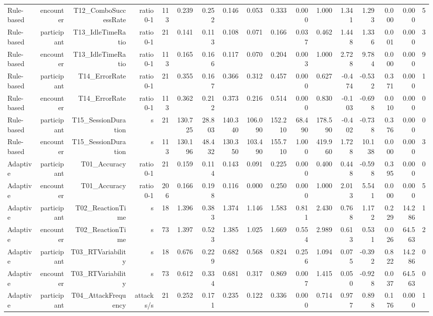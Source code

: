 \documentclass[10pt]{article}
\begin{document}
{\begin{longtable}{lrrrrrrrrrrrrrrrr}
Rule-based & encounter & T12\_ComboSuccessRate & ratio 0-1 & 113 & 0.239 & 0.252 & 0.146 & 0.053 & 0.333 & 0.000 & 1.000 & 1.341 & 1.293 & 0.000 & 0.000 & 5 \\
Rule-based & participant & T13\_IdleTimeRatio & ratio 0-1 & 21 & 0.141 & 0.113 & 0.108 & 0.071 & 0.166 & 0.037 & 0.462 & 1.448 & 1.336 & 0.001 & 0.000 & 3 \\
Rule-based & encounter & T13\_IdleTimeRatio & ratio 0-1 & 113 & 0.165 & 0.166 & 0.117 & 0.070 & 0.204 & 0.003 & 1.000 & 2.728 & 9.784 & 0.000 & 0.000 & 9 \\
Rule-based & participant & T14\_ErrorRate & ratio 0-1 & 21 & 0.355 & 0.167 & 0.366 & 0.312 & 0.457 & 0.000 & 0.627 & -0.474 & -0.532 & 0.371 & 0.000 & 1 \\
Rule-based & encounter & T14\_ErrorRate & ratio 0-1 & 113 & 0.362 & 0.212 & 0.373 & 0.216 & 0.514 & 0.000 & 0.830 & -0.103 & -0.698 & 0.010 & 0.000 & 0 \\
Rule-based & participant & T15\_SessionDuration & s & 21 & 130.725 & 28.803 & 140.340 & 106.090 & 152.210 & 68.490 & 178.590 & -0.402 & -0.738 & 0.376 & 0.000 & 0 \\
Rule-based & encounter & T15\_SessionDuration & s & 113 & 130.196 & 48.432 & 130.350 & 103.490 & 155.710 & 1.000 & 419.960 & 1.728 & 10.138 & 0.000 & 0.000 & 3 \\
Adaptive & participant & T01\_Accuracy & ratio 0-1 & 21 & 0.159 & 0.114 & 0.143 & 0.091 & 0.225 & 0.000 & 0.400 & 0.448 & -0.598 & 0.395 & 0.000 & 0 \\
Adaptive & encounter & T01\_Accuracy & ratio 0-1 & 206 & 0.166 & 0.198 & 0.116 & 0.000 & 0.250 & 0.000 & 1.000 & 2.013 & 5.541 & 0.000 & 0.000 & 5 \\
Adaptive & participant & T02\_ReactionTime & s & 18 & 1.396 & 0.383 & 1.374 & 1.146 & 1.583 & 0.811 & 2.430 & 0.768 & 1.172 & 0.229 & 14.286 & 1 \\
Adaptive & encounter & T02\_ReactionTime & s & 73 & 1.397 & 0.523 & 1.385 & 1.025 & 1.669 & 0.554 & 2.989 & 0.613 & 0.531 & 0.026 & 64.563 & 2 \\
Adaptive & participant & T03\_RTVariability & s & 18 & 0.676 & 0.229 & 0.682 & 0.568 & 0.824 & 0.256 & 1.094 & 0.075 & -0.392 & 0.822 & 14.286 & 0 \\
Adaptive & encounter & T03\_RTVariability & s & 73 & 0.612 & 0.334 & 0.681 & 0.317 & 0.869 & 0.007 & 1.415 & 0.050 & -0.928 & 0.037 & 64.563 & 0 \\
Adaptive & participant & T04\_AttackFrequency & attacks/s & 21 & 0.252 & 0.171 & 0.235 & 0.122 & 0.336 & 0.000 & 0.714 & 0.977 & 0.898 & 0.176 & 0.000 & 1 \\

\end{longtable}}
\end{document}
